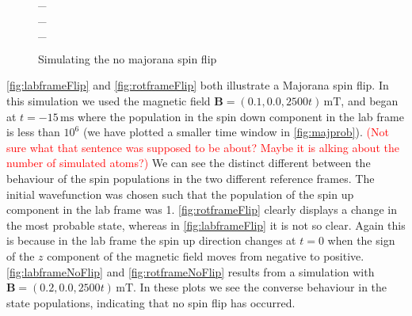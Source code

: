 \begin{figure}
\_
\hspace{-14em}
\\\_
\hspace{-14em}
\\\_
\hspace{-12em}
\caption{Simulating the no majorana spin flip }\label{fig:majprob}
\end{figure}

\autoref{fig:labframeFlip} and \autoref{fig:rotframeFlip} both illustrate a Majorana spin flip.
In this simulation we used the magnetic field $\mathbf{B}=(0.1,0.0,2500t)\,\mathrm{mT}$, and began at $t=-15\,\mathrm{ms}$ where the population in the spin down component in the lab frame is less than $10^{6}$ (we have plotted a smaller time window in \autoref{fig:majprob}). \textcolor{red}{(Not sure what that sentence was supposed to be about? Maybe it is alking about the number of simulated atoms?)}
We can see the distinct different between the behaviour of the spin populations in the two different reference frames.
The initial wavefunction was chosen such that the population of the spin up component in the lab frame was 1.
\autoref{fig:rotframeFlip} clearly displays a change in the most probable state, whereas in \autoref{fig:labframeFlip} it is not so clear.
Again this is because in the lab frame the spin up direction changes at $t=0$ when the sign of the $z$ component of the magnetic field moves from negative to positive.
\autoref{fig:labframeNoFlip} and \autoref{fig:rotframeNoFlip} results from a simulation with $\mathbf{B}=(0.2,0.0,2500t)\,\mathrm{mT}$.
In these plots we see the converse behaviour in the state populations, indicating that no spin flip has occurred.

